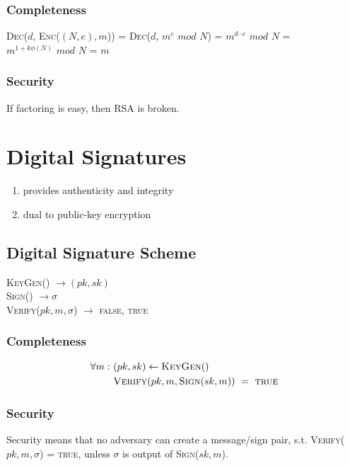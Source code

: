 \documentclass{report}
\begin{document}
\begin{adjustwidth}{2em}{2em}
\begin{adjustwidth}{2em}{}
		\subsubsection{Completeness}
		\begin{adjustwidth}{2em}{-4em}
			\textsc{Dec}($d$, \textsc{Enc}($(N,e),m$)) =  \textsc{Dec}($d$, $m^e \textit{ mod } N$) = $m^{d \cdot e} \textit{ mod } N$ = $m^{1 + k \phi (N)} \textit{ mod } N $ = $m$
		\end{adjustwidth}
		\subsubsection{Security}
		\begin{adjustwidth}{2em}{}
			If factoring is easy, then RSA is broken.
		\end{adjustwidth}
	\end{adjustwidth}
\end{adjustwidth}

\section{Digital Signatures}
\begin{adjustwidth}{2em}{2em}
	\begin{enumerate}[-]
		\item provides authenticity and integrity
		\item dual to public-key encryption
	\end{enumerate}
	\subsection{Digital Signature Scheme}
	\begin{adjustwidth}{2em}{}
		\textsc{KeyGen}() $\rightarrow (pk, sk)$ \\
		\textsc{Sign}() $\rightarrow \sigma$ \\
		\textsc{Verify}($pk, m, \sigma$) $\rightarrow$ \textsc{false, true}
		\subsubsection{Completeness}
		\begin{align*}
			\forall m: \ & (pk, sk) \leftarrow \textsc{KeyGen}() \\
			& \textsc{Verify}(pk, m, \textsc{Sign}(sk, m)) \ = \ \textsc{true}
		\end{align*}
		\subsubsection{Security}
		\begin{adjustwidth}{2em}{}
			Security means that no adversary can create a message/sign pair, s.t. \textsc{Verify}($pk, m, \sigma$) = \textsc{true}, unless $\sigma$ is output of \textsc{Sign}($sk, m$).
		\end{adjustwidth}
	\end{adjustwidth}
\end{adjustwidth}
\end{document}
